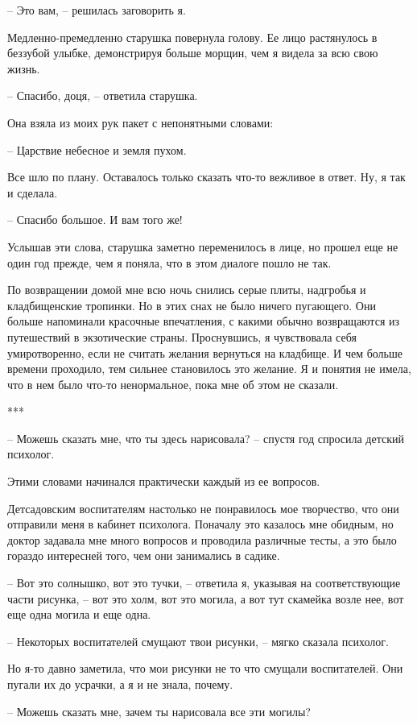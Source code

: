 \documentclass[
]{book}
\begin{document}
-- Это вам, -- решилась заговорить я.

Медленно-премедленно старушка повернула голову. Ее лицо растянулось в беззубой улыбке, демонстрируя больше морщин, чем я видела за всю свою жизнь.

-- Спасибо, доця, -- ответила старушка.

Она взяла из моих рук пакет с непонятными словами:

-- Царствие небесное и земля пухом.

Все шло по плану. Оставалось только сказать что-то вежливое в ответ. Ну, я так и сделала.

-- Спасибо большое. И вам того же!

Услышав эти слова, старушка заметно переменилось в лице, но прошел еще не один год прежде, чем я поняла, что в этом диалоге пошло не так.

По возвращении домой мне всю ночь снились серые плиты, надгробья и кладбищенские тропинки. Но в этих снах не было ничего пугающего. Они больше напоминали красочные впечатления, с какими обычно возвращаются из путешествий в экзотические страны. Проснувшись, я чувствовала себя умиротворенно, если не считать желания вернуться на кладбище. И чем больше времени проходило, тем сильнее становилось это желание. Я и понятия не имела, что в нем было что-то ненормальное, пока мне об этом не сказали.

***

-- Можешь сказать мне, что ты здесь нарисовала? -- спустя год спросила детский психолог.

Этими словами начинался практически каждый из ее вопросов.

Детсадовским воспитателям настолько не понравилось мое творчество, что они отправили меня в кабинет психолога. Поначалу это казалось мне обидным, но доктор задавала мне много вопросов и проводила различные тесты, а это было гораздо интересней того, чем они занимались в садике.

-- Вот это солнышко, вот это тучки, -- ответила я, указывая на соответствующие части рисунка, -- вот это холм, вот это могила, а вот тут скамейка возле нее, вот еще одна могила и еще одна.

-- Некоторых воспитателей смущают твои рисунки, -- мягко сказала психолог.

Но я-то давно заметила, что мои рисунки не то что смущали воспитателей. Они пугали их до усрачки, а я и не знала, почему.

-- Можешь сказать мне, зачем ты нарисовала все эти могилы?
\end{document}
